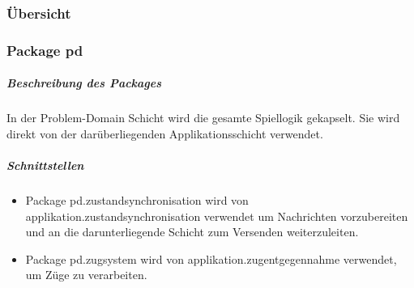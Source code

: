 \documentclass[a4paper,12pt,halfparskip,DIV14]{scrartcl}
\begin{document}
\newpage
\subsubsection{Übersicht} %
\label{ssub:Übersicht}

\subsubsection{Package pd} %
\label{ssub:package_pd}
\subparagraph{Beschreibung des Packages} %
\label{ssub:beschreibung_des_packages}
In der Problem-Domain Schicht wird die gesamte Spiellogik gekapselt. Sie wird direkt von der darüberliegenden Applikationsschicht verwendet.
\subparagraph{Schnittstellen} %
\label{ssub:schnittstellen}
\begin{itemize}
	\item Package pd.zustandsynchronisation wird von applikation.zustandsynchronisation verwendet um Nachrichten vorzubereiten und an die darunterliegende Schicht zum Versenden weiterzuleiten.
	\item Package pd.zugsystem wird von applikation.zugentgegennahme verwendet, um Züge zu verarbeiten.
\end{itemize}

\newpage
\end{document}
